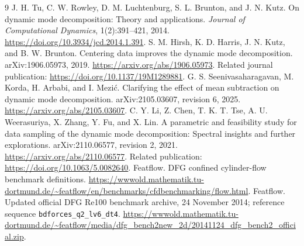 \documentclass[11pt,a4paper]{article}
\begin{document}
\FloatBarrier
\begin{thebibliography}{9}
\footnotesize
\setlength{\itemsep}{2pt}
 J. H. Tu, C. W. Rowley, D. M. Luchtenburg, S. L. Brunton, and J. N. Kutz. On dynamic mode decomposition: Theory and applications. \emph{Journal of Computational Dynamics}, 1(2):391--421, 2014. \url{https://doi.org/10.3934/jcd.2014.1.391}.
 S. M. Hirsh, K. D. Harris, J. N. Kutz, and B. W. Brunton. Centering data improves the dynamic mode decomposition. arXiv:1906.05973, 2019. \url{https://arxiv.org/abs/1906.05973}. Related journal publication: \url{https://doi.org/10.1137/19M1289881}.
 G. S. Seenivasaharagavan, M. Korda, H. Arbabi, and I. Mezi\'c. Clarifying the effect of mean subtraction on dynamic mode decomposition. arXiv:2105.03607, revision 6, 2025. \url{https://arxiv.org/abs/2105.03607}.
 C. Y. Li, Z. Chen, T. K. T. Tse, A. U. Weerasuriya, X. Zhang, Y. Fu, and X. Lin. A parametric and feasibility study for data sampling of the dynamic mode decomposition: Spectral insights and further explorations. arXiv:2110.06577, revision 2, 2021. \url{https://arxiv.org/abs/2110.06577}. Related publication: \url{https://doi.org/10.1063/5.0082640}.
 Featflow. DFG confined cylinder-flow benchmark definitions. \url{https://wwwold.mathematik.tu-dortmund.de/~featflow/en/benchmarks/cfdbenchmarking/flow.html}.
 Featflow. Updated official DFG Re100 benchmark archive, 24 November 2014; reference sequence \texttt{bdforces\_q2\_lv6\_dt4}. \url{https://wwwold.mathematik.tu-dortmund.de/~featflow/media/dfg_bench2new_2d/20141124_dfg_bench2_official.zip}.
\end{thebibliography}
\end{document}
